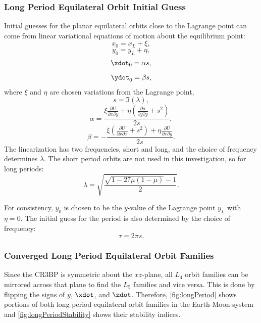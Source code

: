 \subsubsection{Long Period Equilateral Orbit Initial Guess}
Initial guesses for the planar equilateral orbits close to the Lagrange point can come from linear
variational equations of motion about the equilibrium point:
\begin{equation}
    x_{0}=x_{L}+\xi,
    \label{eq:xvareq}
\end{equation}
\begin{equation}
    y_{0}=y_{L}+\eta,
    \label{eq:yvareq}
\end{equation}
\begin{equation}
    \xdot_{0}=\alpha s,
    \label{eq:xdotvareq}
\end{equation}
\begin{equation}
    \ydot_{0}=\beta s,
    \label{eq:ydotvareq}
\end{equation}
where $\xi$ and $\eta$ are chosen variations from the Lagrange point,
\begin{equation}
    s=\Im(\lambda),
    \label{eq:seq}
\end{equation}
\begin{equation}
    \alpha=\frac{\xi\frac{\partial U}{\partial x\partial y}+\eta(\frac{\partial u}{\partial y\partial y}+s^{2})}{2s},
    \label{eq:alphaeq}
\end{equation}
\begin{equation}
    \beta=-\frac{\xi(\frac{\partial U}{\partial x\partial x}+s^{2})+\eta\frac{\partial U}{\partial x\partial y}}{2s}.
    \label{eq:betaeq}
\end{equation}
The linearization has two frequencies, short and long, and the choice of frequency determines
$\lambda$. The short period orbits are not used in this investigation, so for long periods:
\begin{equation}
    \lambda=\sqrt{\frac{\sqrt{1-27\mu(1-\mu)}-1}{2}}.
    \label{eq:lambdaeq}
\end{equation}

For consistency, $y_{0}$ is chosen to be the $y$-value of the Lagrange point $y_{L}$ with $\eta=0$.
The initial guess for the period is also determined by the choice of frequency:
\begin{equation}
    \tau=2\pi s.
    \label{eq:taueq}
\end{equation}

\subsubsection{Converged Long Period Equilateral Orbit Families}
Since the CR3BP is symmetric about the $xz$-plane, all $L_{4}$ orbit families can be mirrored
across that plane to find the $L_{5}$ families and vice versa. This is done by flipping the signs
of $y$, $\xdot$, and $\zdot$. Therefore, \cref{fig:longPeriod} shows portions of both long period
equilateral orbit families in the Earth-Moon system and \cref{fig:longPeriodStability} shows their
stability indices. 

